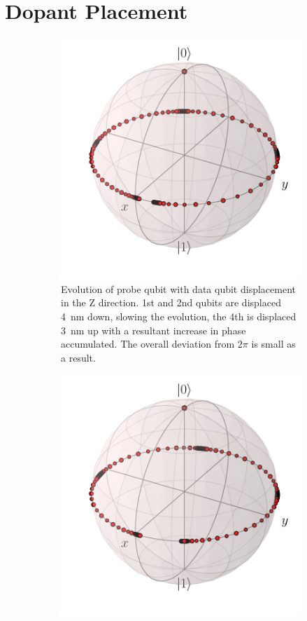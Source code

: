 \section{Dopant Placement}
\begin{figure}
	\centering
	\begin{subfigure}[t]{0.7\textwidth}
		\includegraphics[width=\textwidth]{figures/z_offset.pdf}
		\caption{Evolution of probe qubit with data qubit displacement in the Z direction. 1st and 2nd qubits are displaced \SI{4}{\nano\metre} down, slowing the evolution, the 4th is displaced \SI{3}{\nano\metre} up with a resultant increase in phase accumulated. The overall deviation from $2\pi$ is small as a result.}
		\label{fig:zoffset}
	\end{subfigure}
	\begin{subfigure}[t]{0.7\textwidth}
		\includegraphics[width=\textwidth]{figures/10nm_displacement_inward.pdf}

\end{subfigure}
\end{figure}
